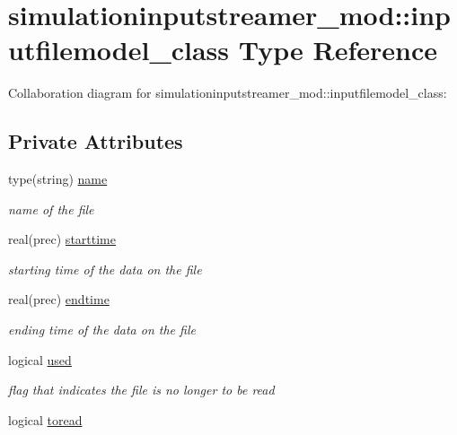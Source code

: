 \hypertarget{structsimulationinputstreamer__mod_1_1inputfilemodel__class}{}\section{simulationinputstreamer\+\_\+mod\+:\+:inputfilemodel\+\_\+class Type Reference}
\label{structsimulationinputstreamer__mod_1_1inputfilemodel__class}


Collaboration diagram for simulationinputstreamer\+\_\+mod\+:\+:inputfilemodel\+\_\+class\+:
\subsection*{Private Attributes}
\begin{DoxyCompactItemize}
\item 
type(string) \mbox{\hyperlink{structsimulationinputstreamer__mod_1_1inputfilemodel__class_a882b0dfc49829e8a04905a7ead0e97a3}{name}}
\begin{DoxyCompactList}\small\item\em name of the file \end{DoxyCompactList}\item 
real(prec) \mbox{\hyperlink{structsimulationinputstreamer__mod_1_1inputfilemodel__class_a722618dceb1aeba15c68e5313a14405f}{starttime}}
\begin{DoxyCompactList}\small\item\em starting time of the data on the file \end{DoxyCompactList}\item 
real(prec) \mbox{\hyperlink{structsimulationinputstreamer__mod_1_1inputfilemodel__class_ad25a4514610666475497835d54346a76}{endtime}}
\begin{DoxyCompactList}\small\item\em ending time of the data on the file \end{DoxyCompactList}\item 
logical \mbox{\hyperlink{structsimulationinputstreamer__mod_1_1inputfilemodel__class_a003333db579141a5b52c141b591cc86b}{used}}
\begin{DoxyCompactList}\small\item\em flag that indicates the file is no longer to be read \end{DoxyCompactList}\item 
logical \mbox{\hyperlink{structsimulationinputstreamer__mod_1_1inputfilemodel__class_a240b7aa50c7f8a2b5e67b40a0652c5ac}{toread}}
\end{DoxyCompactItemize}


